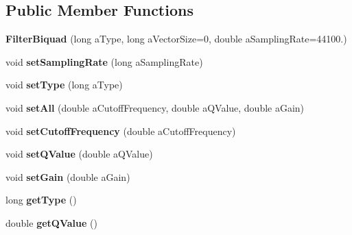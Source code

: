 \subsection*{Public Member Functions}
\begin{DoxyCompactItemize}
\item 
\hypertarget{class_filter_biquad_a9a504b833a433b8577a41b521b717b21}{{\bfseries Filter\-Biquad} (long a\-Type, long a\-Vector\-Size=0, double a\-Sampling\-Rate=44100.)}\label{class_filter_biquad_a9a504b833a433b8577a41b521b717b21}

\item 
\hypertarget{class_filter_biquad_a321faeeacbe9896e47b377b23d74637d}{void {\bfseries set\-Sampling\-Rate} (long a\-Sampling\-Rate)}\label{class_filter_biquad_a321faeeacbe9896e47b377b23d74637d}

\item 
\hypertarget{class_filter_biquad_ac0ba3ef15154149523b071a4a314112d}{void {\bfseries set\-Type} (long a\-Type)}\label{class_filter_biquad_ac0ba3ef15154149523b071a4a314112d}

\item 
\hypertarget{class_filter_biquad_af91ac10594525c676cb47a159239e466}{void {\bfseries set\-All} (double a\-Cutoff\-Frequency, double a\-Q\-Value, double a\-Gain)}\label{class_filter_biquad_af91ac10594525c676cb47a159239e466}

\item 
\hypertarget{class_filter_biquad_ae3c1fdf80fd3621cefb7362082add267}{void {\bfseries set\-Cutoff\-Frequency} (double a\-Cutoff\-Frequency)}\label{class_filter_biquad_ae3c1fdf80fd3621cefb7362082add267}

\item 
\hypertarget{class_filter_biquad_a35f3317cdef03dd351a4a9401dff74c0}{void {\bfseries set\-Q\-Value} (double a\-Q\-Value)}\label{class_filter_biquad_a35f3317cdef03dd351a4a9401dff74c0}

\item 
\hypertarget{class_filter_biquad_a4d43410d2a3f408d20167ab930bbf5d8}{void {\bfseries set\-Gain} (double a\-Gain)}\label{class_filter_biquad_a4d43410d2a3f408d20167ab930bbf5d8}

\item 
\hypertarget{class_filter_biquad_a2f0de4d82960ede2e3c90ce09ffa40d1}{long {\bfseries get\-Type} ()}\label{class_filter_biquad_a2f0de4d82960ede2e3c90ce09ffa40d1}

\item 
\hypertarget{class_filter_biquad_abafde4e1288c78428a670301dd04358c}{double {\bfseries get\-Q\-Value} ()}\label{class_filter_biquad_abafde4e1288c78428a670301dd04358c}


\end{DoxyCompactItemize}
